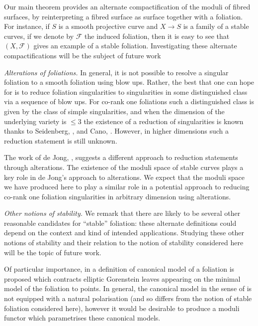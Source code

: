 \documentclass[12pt, a4paper]{amsart}
\theoremstyle{definition}
\theoremstyle{named}
\begin{document}
Our main theorem provides an alternate compactification of the moduli of fibred surfaces, by reinterpreting a fibred surface as surface together with a foliation.
For instance, if  $S$ is a smooth projective curve and $X \to S$ is a family of a stable curves, if we denote by $\mathcal F$ the induced foliation, then it is easy to see that $(X, \mathcal F)$ gives an example of a stable foliation.
Investigating these alternate compactifications will be the subject of future work

{\it Alterations of foliations.}  In general, it is not possible to resolve a singular foliation to a smooth foliation using blow ups.  Rather, the best that one can hope for is to reduce foliation singularities to singularities in some distinguished class via a sequence of blow ups.  For co-rank one foliations such a distinguished class is given by the class of simple singularities, and when the dimension of the underlying variety is $\leq 3$ the existence of a reduction of singularities is known thanks to Seidenberg, \cite{Seidenberg68}, and Cano, \cite{Cano}.  However, in higher dimensions such a reduction statement is still unknown.   

The work of de Jong, \cite{Jong96}, suggests a different approach to reduction statements through alterations. The existence of the moduli space of stable curves plays a key role in de Jong's approach to alterations.  We expect that the moduli space we have produced here to play a similar role in a potential approach to reducing co-rank one foliation singularities in arbitrary dimension using alterations.


{\it Other notions of stability.}
We remark that there are likely to be several other reasonable candidates for ``stable'' foliation: these alternate definitions could depend on the context and kind of intended applications.  Studying these other notions of stability and their relation to the notion of stability considered here will be the topic of future work.

Of particular importance, in \cite[\S III.3]{McQuillan08} a definition of canonical model of a foliation is proposed which contracts elliptic Gorenstein leaves appearing on the minimal model of the foliation to points.  In general, the canonical model in the sense of \cite{McQuillan08} is not equipped with a natural polarisation (and so differs from the notion of stable foliation considered here), however it would be desirable to produce a moduli functor 
which parametrises these canonical models.
\end{document}
